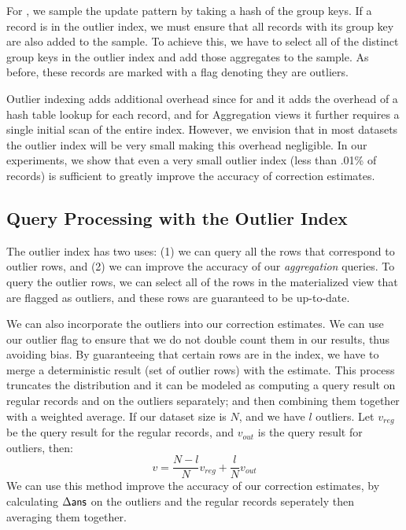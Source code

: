 For \aggview, we sample the update pattern by taking a hash of the group keys.
If a record is in the outlier index, we must ensure that all records with its group key are also added to the sample.
To achieve this, we have to select all of the distinct group keys in the outlier index and add those aggregates to the sample.
As before, these records are marked with a flag denoting they are outliers.

Outlier indexing adds additional overhead since for \spview and \fjview it adds the overhead of a hash table lookup for each record, and for Aggregation views it further requires a single initial scan of the entire index. 
However, we envision that in most datasets the outlier index will be very small making this overhead negligible.
In our experiments, we show that even a very small outlier index (less than .01\% of records) is sufficient to greatly improve the accuracy of
correction estimates.


\subsection{Query Processing with the Outlier Index} 
The outlier index has two uses: (1) we can query all the rows that correspond to outlier rows, 
and (2) we can improve the accuracy of our \emph{aggregation} queries.
To query the outlier rows, we can select all of the rows in the materialized view that are flagged as outliers, and these rows are guaranteed to be up-to-date.

We can also incorporate the outliers into our correction estimates. 
We can use our outlier flag to ensure that we do not double count them in our results, thus avoiding bias. 
By guaranteeing that certain rows are in the index, we
have to merge a deterministic result (set of outlier rows) with the
estimate. 
This process truncates the distribution and it can be modeled as computing a query
result on regular records and on the outliers separately; and then combining them together with
a weighted average. 
If our dataset size is $N$, and we have $l$ outliers. 
Let $v_{reg}$ be the query result for the regular records, and $v_{out}$ is the query result for outliers, then:
\[
 v = \frac{N-l}{N}v_{reg} + \frac{l}{N}v_{out}
\]
We can use this method improve the accuracy of our correction estimates, by calculating $\Delta\textsf{ans}$ 
on the outliers and the regular records seperately then averaging them together. 
